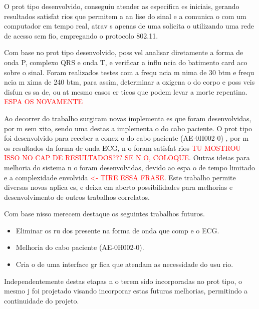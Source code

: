 \documentclass{article}
\begin{document}
O prot tipo desenvolvido, conseguiu atender as especifica es iniciais, gerando resultados satisfat rios que permitem a an lise do sinal e a comunica o com um computador em tempo real, atrav s apenas de uma solicita o utilizando uma rede de acesso sem fio, empregando o protocolo 802.11.

Com base no prot tipo desenvolvido,   poss vel analisar diretamente a forma de onda P, complexo QRS e onda T, e verificar a influ ncia do batimento card aco sobre o sinal. Foram realizados testes com a frequ ncia m nima de 30 btm e frequ ncia m xima de 240 btm, para assim,  determinar a oxigena o do corpo e poss veis disfun es   sa de, ou at  mesmo casos cr ticos que podem levar a morte repentina. \textcolor{red}{ESPA OS NOVAMENTE}

Ao decorrer do trabalho surgiram novas implementa es que  foram desenvolvidas, por m sem  xito, sendo uma destas a implementa o do cabo paciente. O prot tipo foi desenvolvido para receber a conex o do cabo paciente (AE-0H002-0) , por m os resultados da forma de onda ECG, n o foram satisfat rios \textcolor{red}{TU MOSTROU ISSO NO CAP DE RESULTADOS??? SE N O, COLOQUE}. Outras ideias para melhoria do sistema n o foram desenvolvidas, devido ao espa o de tempo limitado e a complexidade envolvida \textcolor{red}{<- TIRE ESSA FRASE}. Este trabalho permite diversas novas aplica es, e deixa em aberto possibilidades para melhorias e  desenvolvimento de outros trabalhos correlatos.

Com base nisso merecem destaque os seguintes trabalhos futuros.

\begin{itemize}
\item Eliminar os ru dos presente na forma de onda que comp e o ECG.
\item Melhoria do cabo paciente (AE-0H002-0).
\item Cria o de uma interface gr fica que atendam as necessidade do usu rio.
\end{itemize}

Independentemente destas etapas n o terem sido incorporadas no prot tipo, o mesmo j  foi projetado visando incorporar estas futuras melhorias, permitindo a continuidade do projeto.

\newpage


%
\providecommand*{\refname}{}
\renewcommand*{\refname}{\begin{center}\textbf{REFER NCIAS}\end{center}}
\end{document}
